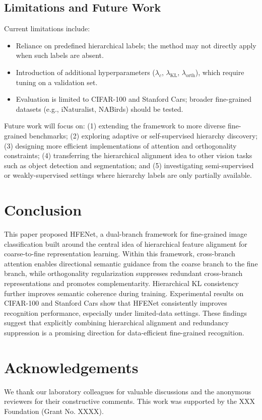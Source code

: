 \documentclass[pdflatex,sn-mathphys-num]{sn-jnl}
\theoremstyle{thmstyleone}%
\theoremstyle{thmstyletwo}%
\theoremstyle{thmstylethree}%
\begin{document}
\subsection{Limitations and Future Work}
Current limitations include:
\begin{itemize}
    \item Reliance on predefined hierarchical labels; the method may not directly apply when such labels are absent.
    \item Introduction of additional hyperparameters ($\lambda_c$, $\lambda_{\mathrm{KL}}$, $\lambda_{\mathrm{orth}}$), which require tuning on a validation set.
    \item Evaluation is limited to CIFAR-100 and Stanford Cars; broader fine-grained datasets (e.g., iNaturalist, NABirds) should be tested.
\end{itemize}
Future work will focus on: (1) extending the framework to more diverse fine-grained benchmarks; (2) exploring adaptive or self-supervised hierarchy discovery; (3) designing more efficient implementations of attention and orthogonality constraints; (4) transferring the hierarchical alignment idea to other vision tasks such as object detection and segmentation; and (5) investigating semi-supervised or weakly-supervised settings where hierarchy labels are only partially available.

\section{Conclusion}
\label{sec:conclusion}
This paper proposed HFENet, a dual-branch framework for fine-grained image classification built around the central idea of hierarchical feature alignment for coarse-to-fine representation learning. 
Within this framework, cross-branch attention enables directional semantic guidance from the coarse branch to the fine branch, while orthogonality regularization suppresses redundant cross-branch representations and promotes complementarity. 
Hierarchical KL consistency further improves semantic coherence during training. 
Experimental results on CIFAR-100 and Stanford Cars show that HFENet consistently improves recognition performance, especially under limited-data settings. 
These findings suggest that explicitly combining hierarchical alignment and redundancy suppression is a promising direction for data-efficient fine-grained recognition.

\section*{Acknowledgements}
We thank our laboratory colleagues for valuable discussions and the anonymous reviewers for their constructive comments. This work was supported by the XXX Foundation (Grant No. XXXX).
\end{document}
